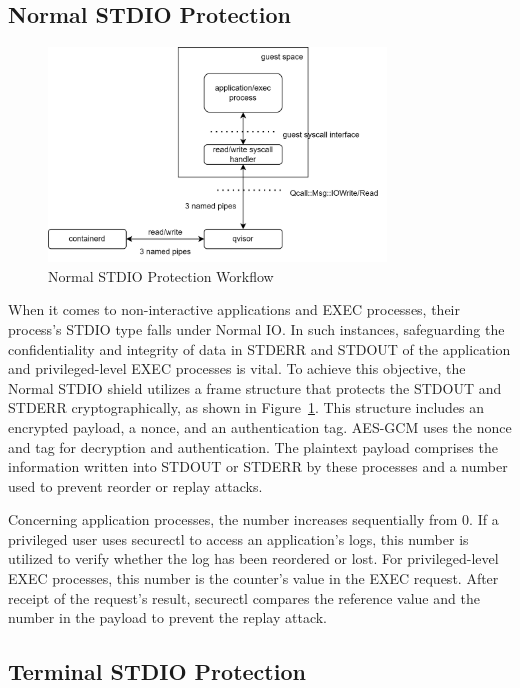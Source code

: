 \subsection{Normal STDIO Protection}

\begin{figure}[H]
    \centering
    \includegraphics[width=0.8\textwidth]{images/normorl_io.png}
    \caption[Normal STDIO Protection Workflow]{Normal STDIO Protection Workflow}
    \label{fig:normorl_io}
\end{figure}


When it comes to non-interactive applications and EXEC processes, their process's STDIO type falls under Normal IO. In such instances, safeguarding the confidentiality and integrity of data in STDERR and STDOUT of the application and privileged-level 
EXEC processes is vital. To achieve this objective, the Normal STDIO shield utilizes a frame structure that protects the STDOUT and STDERR cryptographically, as shown in Figure~\ref{fig:normorl_io}. This structure includes an encrypted payload, a nonce, and an 
authentication tag. AES-GCM uses the nonce and tag for decryption and authentication. The plaintext payload comprises the information written into STDOUT or STDERR by these processes and a number used to prevent reorder or replay attacks.

Concerning application processes, the number increases sequentially from 0. If a privileged user uses securectl to access an application's logs, this number is utilized to verify whether the log has been reordered or lost. For privileged-level 
EXEC processes, this number is the counter's value in the EXEC request. After receipt of the request's result, securectl compares the reference value and the number in the payload to prevent the replay attack.


\subsection{Terminal STDIO Protection}


